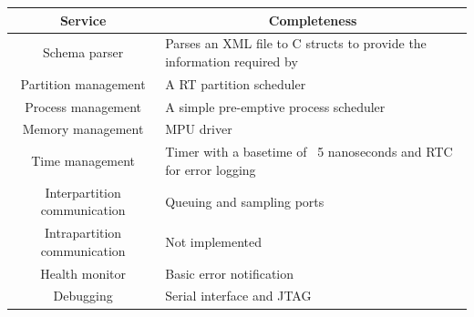 \begin{center}
	\begin{tabular} {| c | p{7cm} |}
		\multicolumn{1}{c}{\textbf{Service}} &
		\multicolumn{1}{c}{\textbf{Completeness}} \\
		\hline
		Schema parser &
		Parses an XML file to C structs to provide the information required by \OSname \\
		\hline
		Partition management &
		A RT partition scheduler \\
		\hline
		Process management &
		A simple pre-emptive process scheduler \\
		\hline
		Memory management &
		MPU driver \\
		\hline
		Time management &
		Timer with a basetime of ~5 nanoseconds and RTC for error logging \\
		\hline
		Interpartition communication &
		Queuing and sampling ports \\
		\hline
		Intrapartition communication &
		Not implemented \\
		\hline
		Health monitor &
		Basic error notification \\
		\hline
		Debugging &
		Serial interface and JTAG \\
		\hline
	\end{tabular}
\end{center}
